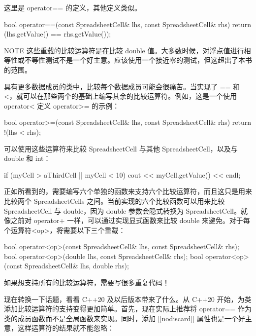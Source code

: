 这里是 operator== 的定义，其他定义类似。

\begin{cpp}
bool operator==(const SpreadsheetCell& lhs, const SpreadsheetCell& rhs)
{
    return (lhs.getValue() == rhs.getValue());
}
\end{cpp}

\begin{myNotic}{NOTE}
这些重载的比较运算符是在比较 double 值。大多数时候，对浮点值进行相等性或不等性测试不是一个好主意。应该使用一个接近零的测试，但这超出了本书的范围。
\end{myNotic}

具有更多数据成员的类中，比较每个数据成员可能会很痛苦。当实现了 == 和 <，就可以在那些两个的基础上编写其余的比较运算符。例如，这是一个使用 operator< 定义 operator>= 的示例：

\begin{cpp}
bool operator>=(const SpreadsheetCell& lhs, const SpreadsheetCell& rhs)
{
    return !(lhs < rhs);
}
\end{cpp}

可以使用这些运算符来比较 SpreadsheetCell 与其他 SpreadsheetCell，以及与 double 和 int：

\begin{cpp}
if (myCell > aThirdCell || myCell < 10) {
    cout << myCell.getValue() << endl;
}
\end{cpp}

正如所看到的，需要编写六个单独的函数来支持六个比较运算符，而且这只是用来比较两个 SpreadsheetCells 之间。当前实现的六个比较函数可以用来比较 SpreadsheetCell 与 double，因为 double 参数会隐式转换为 SpreadsheetCell。就像之前对 operator+ 一样，可以通过实现显式函数来比较 double 来避免。对于每个运算符<op>，将需要以下三个重载：

\begin{cpp}
bool operator<op>(const SpreadsheetCell& lhs, const SpreadsheetCell& rhs);
bool operator<op>(double lhs, const SpreadsheetCell& rhs);
bool operator<op>(const SpreadsheetCell& lhs, double rhs);
\end{cpp}

如果想支持所有的比较运算符，需要写很多重复代码！


现在转换一下话题，看看 C++20 及以后版本带来了什么。从 C++20 开始，为类添加比较运算符的支持变得更加简单。首先，现在实际上推荐将 operator== 作为类的成员函数而不是全局函数来实现。同时，添加 [[nodiscard]] 属性也是一个好主意，这样运算符的结果就不能忽略：

